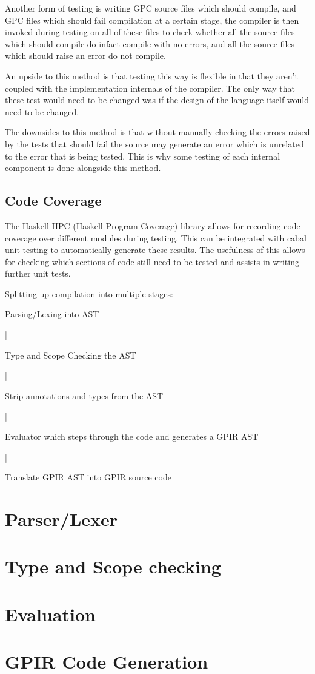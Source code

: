 Another form of testing is writing GPC source files which should compile, and
GPC files which should fail compilation at a certain stage, the compiler
is then invoked during testing on all of these files to check whether
all the source files which should compile do infact compile with no errors,
and all the source files which should raise an error do not compile.

An upside to this method is that testing this way is flexible in that
they aren't coupled with the implementation internals of the compiler.
The only way that these test would need to be changed was if the design
of the language itself would need to be changed.

The downsides to this method is that without manually checking the errors raised
by the tests that should fail the source may generate an error which is unrelated
to the error that is being tested. This is why some testing of each internal
component is done alongside this method.

\subsection{Code Coverage}

The Haskell HPC (Haskell Program Coverage) library allows for recording
code coverage over different modules during testing. This can be integrated with
cabal unit testing to automatically generate these results. The usefulness of this
allows for checking which sections of code still need to be tested and assists
in writing further unit tests.


Splitting up compilation into multiple stages:
    
    Parsing/Lexing into AST

         |

     Type and Scope Checking the AST

         |

     Strip annotations and types from the AST

        |

     Evaluator which steps through the code and generates a 
     GPIR AST

        |

      Translate GPIR AST into GPIR source code

\section{Parser/Lexer}
\section{Type and Scope checking}
\section{Evaluation}
\section{GPIR Code Generation}

